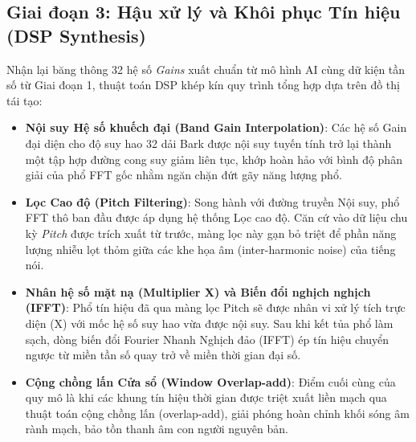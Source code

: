 \subsection{Giai đoạn 3: Hậu xử lý và Khôi phục Tín hiệu (DSP Synthesis)}
Nhận lại băng thông 32 hệ số \textit{Gains} xuất chuẩn từ mô hình AI cùng dữ kiện tần số từ Giai đoạn 1, thuật toán DSP khép kín quy trình tổng hợp dựa trên đồ thị tái tạo:
\begin{itemize}
    \item \textbf{Nội suy Hệ số khuếch đại (Band Gain Interpolation)}: Các hệ số Gain đại diện cho độ suy hao 32 dải Bark được nội suy tuyến tính trở lại thành một tập hợp đường cong suy giảm liên tục, khớp hoàn hảo với bình độ phân giải của phổ FFT gốc nhằm ngăn chặn đứt gãy năng lượng phổ.
    \item \textbf{Lọc Cao độ (Pitch Filtering)}: Song hành với đường truyền Nội suy, phổ FFT thô ban đầu được áp dụng hệ thống Lọc cao độ. Căn cứ vào dữ liệu chu kỳ \textit{Pitch} được trích xuất từ trước, màng lọc này gạn bỏ triệt để phần năng lượng nhiễu lọt thỏm giữa các khe họa âm (inter-harmonic noise) của tiếng nói.
    \item \textbf{Nhân hệ số mặt nạ (Multiplier X) và Biến đổi nghịch nghịch (IFFT)}: Phổ tín hiệu đã qua màng lọc Pitch sẽ được nhân vi xử lý tích trực diện (X) với mốc hệ số suy hao vừa được nội suy. Sau khi kết tủa phổ làm sạch, dòng biến đổi Fourier Nhanh Nghịch đảo (IFFT) ép tín hiệu chuyển ngược từ miền tần số quay trở về miền thời gian đại số.
    \item \textbf{Cộng chồng lấn Cửa sổ (Window Overlap-add)}: Điểm cuối cùng của quy mô là khi các khung tín hiệu thời gian được triệt xuất liền mạch qua thuật toán cộng chồng lấn (overlap-add), giải phóng hoàn chỉnh khối sóng âm rành mạch, bảo tồn thanh âm con người nguyên bản.
\end{itemize}

